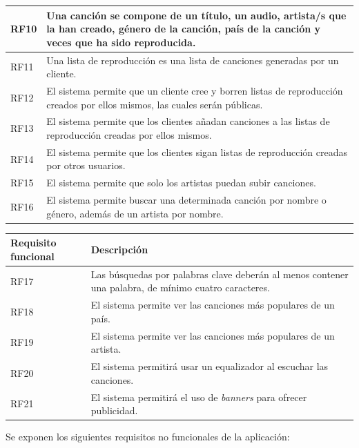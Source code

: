 \documentclass{article}
\begin{document}
\begin{table}[H]
\begin{tabular}{p{4cm} p{10cm}}
		\hline
		RF10
		& Una canción se compone de un título, un audio, artista/s que la han creado, género de la canción, país de la canción y veces que ha sido reproducida. \\ 
		\hline
		RF11
		& Una lista de reproducción es una lista de canciones generadas por un cliente. \\ 
		\hline
		RF12
		& El sistema permite que un cliente cree y borren listas de reproducción creados por ellos mismos, las cuales serán públicas. \\ 
		\hline
		RF13
		& El sistema permite que los clientes añadan canciones a las listas de reproducción creadas por ellos mismos. \\ 
		\hline
		RF14
		& El sistema permite que los clientes sigan listas de reproducción creadas por otros usuarios. \\ 
		\hline
		RF15
		& El sistema permite que solo los artistas puedan subir canciones. \\ 
		\hline
		RF16
		& El sistema permite buscar una determinada canción por nombre o género, además de un artista por nombre. \\ 
		\hline
	\end{tabular}
\end{table}
\break
\begin{table}[H]
	\begin{tabular}{p{4cm} p{10cm}}
		\hline
		\hline 
		\textbf{Requisito funcional}
		\vspace{0.5mm} & \textbf{Descripción} \\ 
		\hline
		\hline
		RF17
		& Las búsquedas por palabras clave deberán al menos contener una palabra, de mínimo cuatro caracteres. \\ 
		\hline 
		RF18
		& El sistema permite ver las canciones más populares de un país. \\ 
		\hline 
		RF19
		& El sistema permite ver las canciones más populares de un artista. \\ 
		\hline
		RF20
		& El sistema permitirá usar un equalizador al escuchar las canciones. \\ 
		\hline
		RF21
		& El sistema permitirá el uso de \textit{banners} para ofrecer publicidad. \\ 
		\hline
	\end{tabular}
\end{table}
Se exponen los siguientes requisitos no funcionales de la aplicación:
\end{document}

